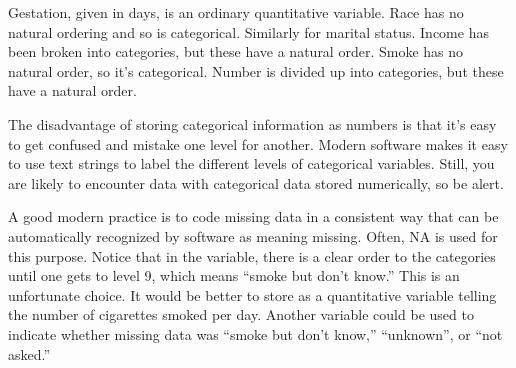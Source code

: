 \begin{AnswerText}
Gestation, given in days, is an ordinary quantitative variable.  Race has no natural ordering and so is categorical.  Similarly for marital status.  Income has been broken into categories, but these have a natural order.  Smoke has no natural order, so it's categorical.  Number is divided up into categories, but these have a natural order.
\end{AnswerText}

The disadvantage of storing categorical information as numbers is that
it's easy to get confused and mistake one level for another.  Modern
software makes it easy to use text strings to label the different
levels of categorical variables.  Still, you are likely to encounter
data with categorical data stored numerically, so be alert.

A good modern practice is to code missing data in a consistent way that can be automatically recognized by 
software as meaning missing.  Often, NA is used for this purpose.  Notice that in the  variable, there is a 
clear order to the categories until one gets to level 9, which means ``smoke but don't know.''  This is an 
unfortunate choice.  It would be better to store  as a quantitative variable telling the number of cigarettes smoked per day.  Another variable could be used to indicate whether missing data was ``smoke but don't know,'' ``unknown'', or ``not asked.''  
